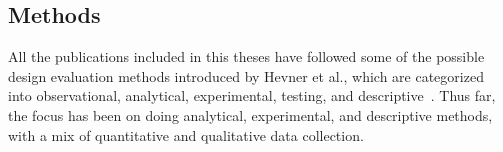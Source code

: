 









\subsection{Methods}

All the publications included in this theses have followed some of the possible design evaluation methods introduced by Hevner et al., which are categorized into observational, analytical, experimental, testing, and descriptive~\cite{DSRM-Hevner}. Thus far, the focus has been on doing analytical, experimental, and descriptive methods, with a mix of quantitative and qualitative data collection.

